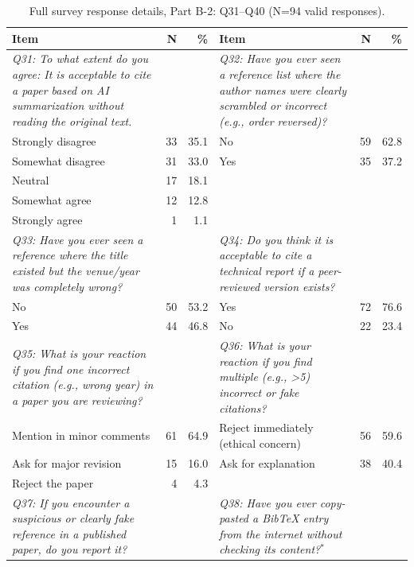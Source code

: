 \begin{table}[htbp]
\centering
\caption{Full survey response details, Part B-2: Q31--Q40 (N=94 valid responses).}
\label{tab:survey_details_full_b2}
\small
\begin{threeparttable}
\begin{tabular}{p{6cm}rr|p{6cm}rr}
\toprule
\textbf{Item} & \textbf{N} & \textbf{\%} & \textbf{Item} & \textbf{N} & \textbf{\%} \\
\midrule
\textit{Q31: To what extent do you agree: It is acceptable to cite a paper based on AI summarization without reading the original text.} & & & \textit{Q32: Have you ever seen a reference list where the author names were clearly scrambled or incorrect (e.g., order reversed)?} & & \\
\rowcolor{tableRowLight}
Strongly disagree & 33 & 35.1 & No & 59 & 62.8 \\
Somewhat disagree & 31 & 33.0 & Yes & 35 & 37.2 \\
\rowcolor{tableRowLight}
Neutral & 17 & 18.1 &  &  &  \\
Somewhat agree & 12 & 12.8 &  &  &  \\
\rowcolor{tableRowLight}
Strongly agree & 1 & 1.1 &  &  &  \\
\midrule
\textit{Q33: Have you ever seen a reference where the title existed but the venue/year was completely wrong?} & & & \textit{Q34: Do you think it is acceptable to cite a technical report if a peer-reviewed version exists?} & & \\
\rowcolor{tableRowLight}
No & 50 & 53.2 & Yes & 72 & 76.6 \\
Yes & 44 & 46.8 & No & 22 & 23.4 \\
\midrule
\textit{Q35: What is your reaction if you find one incorrect citation (e.g., wrong year) in a paper you are reviewing?} & & & \textit{Q36: What is your reaction if you find multiple (e.g., >5) incorrect or fake citations?} & & \\
\rowcolor{tableRowLight}
Mention in minor comments & 61 & 64.9 & Reject immediately (ethical concern) & 56 & 59.6 \\
Ask for major revision & 15 & 16.0 & Ask for explanation & 38 & 40.4 \\
\rowcolor{tableRowLight}
Reject the paper & 4 & 4.3 &  &  &  \\
\midrule
\textit{Q37: If you encounter a suspicious or clearly fake reference in a published paper, do you report it?} & & & \textit{Q38: Have you ever copy-pasted a BibTeX entry from the internet without checking its content?}$^*$ & & \\

\end{tabular}
\end{threeparttable}
\end{table}
